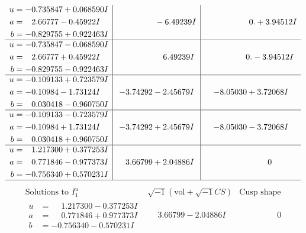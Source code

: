 \documentclass[1p]{elsarticle_modified}
\theoremstyle{definition}
\newcommand{\I}{\sqrt{-1}}
\begin{document}
$$\begin{array}{c|c|c}
\begin{aligned}
u &= -0.735847 + 0.068590 I \\
a &= \phantom{-}2.66777 - 0.45922 I \\
b &= -0.829755 + 0.922463 I\end{aligned}
 & \phantom{-0.000000 } -6.49239 I & \phantom{-0.000000 -}0. + 3.94512 I \\ \hline\begin{aligned}
u &= -0.735847 - 0.068590 I \\
a &= \phantom{-}2.66777 + 0.45922 I \\
b &= -0.829755 - 0.922463 I\end{aligned}
 & \phantom{-0.000000 -}6.49239 I & \phantom{-0.000000 } 0. - 3.94512 I \\ \hline\begin{aligned}
u &= -0.109133 + 0.723579 I \\
a &= -0.10984 - 1.73124 I \\
b &= \phantom{-}0.030418 - 0.960750 I\end{aligned}
 & -3.74292 - 2.45679 I & -8.05030 + 3.72068 I \\ \hline\begin{aligned}
u &= -0.109133 - 0.723579 I \\
a &= -0.10984 + 1.73124 I \\
b &= \phantom{-}0.030418 + 0.960750 I\end{aligned}
 & -3.74292 + 2.45679 I & -8.05030 - 3.72068 I \\ \hline\begin{aligned}
u &= \phantom{-}1.217300 + 0.377253 I \\
a &= \phantom{-}0.771846 - 0.977373 I \\
b &= -0.756340 + 0.570231 I\end{aligned}
 & \phantom{-}3.66799 + 2.04886 I & \phantom{-0.000000 } 0\\
 \hline 
 \end{array}$$\newpage$$\begin{array}{c|c|c}  
\text{Solutions to }I^u_{1}& \I (\text{vol} + \sqrt{-1}CS) & \text{Cusp shape}\\
 \hline 
\begin{aligned}
u &= \phantom{-}1.217300 - 0.377253 I \\
a &= \phantom{-}0.771846 + 0.977373 I \\
b &= -0.756340 - 0.570231 I\end{aligned}
 & \phantom{-}3.66799 - 2.04886 I & \phantom{-0.000000 } 0 \\ \hline\begin{aligned}

\end{aligned}
\end{array}$$
\end{document}
